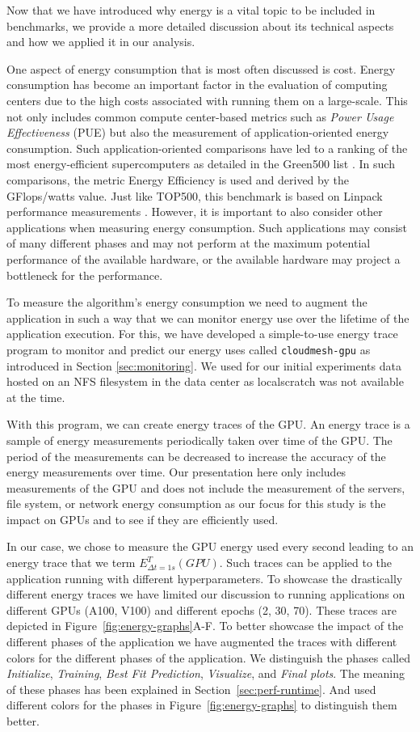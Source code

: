 \documentclass[utf8]{FrontiersinVancouver} %
\begin{document}
Now that we have introduced why energy is a vital topic to be included in benchmarks, we provide a more detailed discussion about its technical aspects and how we applied it in our analysis.

One aspect of energy consumption that is most often discussed is cost.
Energy consumption has become an important factor in the evaluation of computing centers due to the high costs associated with running them on a large-scale. This not only includes common compute center-based metrics such as {\em Power Usage Effectiveness} (PUE) but also the measurement of application-oriented energy consumption.  Such application-oriented comparisons have led to a ranking of the most energy-efficient supercomputers as detailed in the Green500 list \citep{green500}. In such comparisons, the metric Energy Efficiency is used and derived by the GFlops/watts value. Just like TOP500, this benchmark is based on Linpack performance measurements \cite{www-top500}.  However, it is important to also consider other applications when measuring energy consumption. Such applications may consist of many different phases and may not perform at the maximum potential performance of the available hardware, or the available hardware may project a bottleneck for the performance.

To measure the algorithm's energy consumption we need to augment the application in such a way that we can monitor energy use over the lifetime of the application execution. For this, we have developed a simple-to-use energy trace program to monitor and predict our energy uses called \verb|cloudmesh-gpu| as introduced in Section \ref{sec:monitoring}.  We used for our initial experiments data hosted on an NFS filesystem in the data center as localscratch was not available at the time.


With this program, we can create energy traces of the GPU. An energy trace is a sample of energy measurements periodically taken over time of the GPU. The period of the measurements can be decreased to increase the accuracy of the energy measurements over time. Our presentation here only includes measurements of the GPU and does not include the measurement of the servers, file system, or network energy consumption as our focus for this study is the impact on GPUs and to see if they are efficiently used.

In our case, we chose to measure the GPU energy used every second leading to an energy trace that we term $E^T_{\Delta t=1s}(GPU)$. Such traces can be applied to the application running with different hyperparameters. To showcase the drastically different energy traces we have limited our discussion to running applications on different GPUs (A100, V100) and different epochs (2, 30, 70). These traces are depicted in Figure~\ref{fig:energy-graphs}A-F.  To better showcase the impact of the different phases of the application we have augmented the traces with different colors for the different phases of the application.  We distinguish the phases called {\em Initialize}, {\em Training}, {\em Best Fit Prediction}, {\em Visualize}, and {\em Final plots}. The meaning of these phases has been explained in Section~\ref{sec:perf-runtime}. And used different colors for the phases in Figure~\ref{fig:energy-graphs} to distinguish them better.
\end{document}

